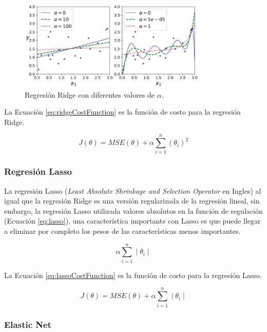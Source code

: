 \begin{figure}[H]
    \centering
    \includegraphics[width=0.8\textwidth]{MarcoTeorico/imgs/Ridge.png}
    \caption{Regresión Ridge con diferentes valores de $\alpha$.}
    \label{fig:regresionRidge}
\end{figure}

La Ecuación \ref{eq:ridgeCostFunction} es la función de costo para la regresión Ridge.

\begin{equation}
    \label{eq:ridgeCostFunction}
    J(\theta) = MSE(\theta)
    + \alpha \displaystyle\sum\limits_{i=1}^n (\theta_i)^{2}
\end{equation}

\subsubsection{Regresión Lasso}

La regresión Lasso (\textit{Least Absolute Shrinkage and Selection Operator} en Ingles) al igual que la regresión Ridge es una versión regularizada de la regresión lineal, sin embargo, la regresión Lasso utilizada valores absolutos en la función de regulación (Ecuación \ref{eq:lasso}), una característica importante con Lasso es que puede llegar a eliminar por completo los pesos de las características menos importantes.

\begin{equation}
    \label{eq:lasso}
    \alpha \displaystyle\sum\limits_{i=1}^n  \mid \theta_i \mid
\end{equation}

La Ecuación \ref{eq:lassoCostFunction} es la función de costo para la regresión Lasso.

\begin{equation}
    \label{eq:lassoCostFunction}
    J(\theta) = MSE(\theta)
    + \alpha \displaystyle\sum\limits_{i=1}^n  \mid \theta_i \mid
\end{equation}

\subsubsection{Elastic Net}


